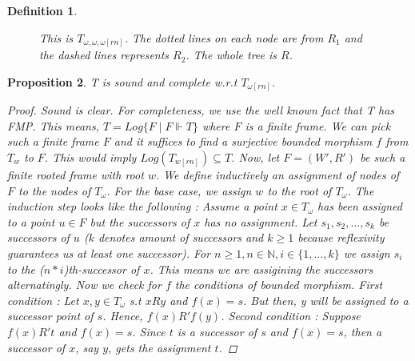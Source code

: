 \documentclass[12pt, a4paper]{scrartcl}
\newtheorem{definition}{Definition}[subsection]
\newtheorem{proposition}[definition]{Proposition}
\begin{document}
\begin{definition}
\begin{figure}[h]
\caption{This is $T_{\omega,\omega,\omega[rn]}$. The dotted lines on each node are from $R_1$ and the dashed lines represents $R_2$. The whole tree is $R$.}
\end{figure}

        
\end{definition}

\begin{proposition}
    T is sound and complete w.r.t $T_{\omega[rn]}$.

    \begin{proof}
    Sound is clear. For completeness, we use the well known fact that T has FMP. This means, $T = Log\{F \mid F \Vdash T\}$ where $F$ is a finite frame.
    We can pick such a finite frame $F$ and it suffices to find a surjective bounded morphism $f$ from $T_w$ to $F$. This would imply $Log(T_{w[rn]}) \subseteq T$. \newline
    Now, let $F = (W', R')$ be such a finite rooted frame with root $w$. We define 
    inductively an assignment of nodes of $F$ to the nodes of $T_\omega$. For the base case, we assign $w$ to the root of $T_\omega$. The induction step looks like the following : 
    Assume a point $x \in T_\omega$ has been assigned to a point $u \in F$ but the successors of $x$ has no assignment. 
    Let $s_1, s_2, ..., s_k$ be successors of $u$ ($k$ denotes amount of successors and $k\geq 1$ because reflexivity guarantees us at least one successor).
    For $n \geq 1, n \in \mathbb{N}, i \in\{1,...,k\}$ we assign $s_i$ to the ($n * i$)th-successor of $x$. This means we are assigining the successors alternatingly. \newline
    Now we check for $f$ the conditions of bounded morphism. First condition : Let $x,y \in T_\omega$ s.t $xRy$ and $f(x) = s$. But then, y will be assigned to a successor point of $s$. 
    Hence, $f(x) R'f(y)$. Second condition : Suppose $f(x)R't$ and $f(x) = s$. Since $t$ is a successor of $s$ and $f(x) = s$, then a successor of $x$, say $y$, gets the assignment $t$. 
    
    \end{proof}
        
\end{proposition}
\clearpage
\end{document}
